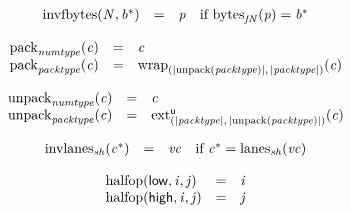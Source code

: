 $$
\begin{array}{@{}lcl@{}l@{}}
{\mathrm{invfbytes}}({\mathit{N}}, {{\mathit{b}}^\ast}) &=& {\mathit{p}} &\quad
  \mbox{if}~{{\mathrm{bytes}}}_{{{\mathit{f}}}{{\mathit{N}}}}({\mathit{p}}) = {{\mathit{b}}^\ast} \\
\end{array}
$$

\vspace{1ex}

\vspace{1ex}

$$
\begin{array}{@{}lcl@{}l@{}}
{{\mathrm{pack}}}_{{\mathit{numtype}}}({\mathit{c}}) &=& {\mathit{c}} &  \\
{{\mathrm{pack}}}_{{\mathit{packtype}}}({\mathit{c}}) &=& {{{\mathrm{wrap}}}_{({|{\mathrm{unpack}}({\mathit{packtype}})|},\, {|{\mathit{packtype}}|})}}{({\mathit{c}})} &  \\
\end{array}
$$

$$
\begin{array}{@{}lcl@{}l@{}}
{{\mathrm{unpack}}}_{{\mathit{numtype}}}({\mathit{c}}) &=& {\mathit{c}} &  \\
{{\mathrm{unpack}}}_{{\mathit{packtype}}}({\mathit{c}}) &=& {{{{\mathrm{ext}}}_{({|{\mathit{packtype}}|},\, {|{\mathrm{unpack}}({\mathit{packtype}})|})}^{\mathsf{u}}}}{({\mathit{c}})} &  \\
\end{array}
$$

\vspace{1ex}

$$
\begin{array}{@{}lcl@{}l@{}}
{{\mathrm{invlanes}}}_{{\mathit{sh}}}({{\mathit{c}}^\ast}) &=& {\mathit{vc}} &\quad
  \mbox{if}~{{\mathit{c}}^\ast} = {{\mathrm{lanes}}}_{{\mathit{sh}}}({\mathit{vc}}) \\
\end{array}
$$

$$
\begin{array}{@{}lcl@{}l@{}}
{\mathrm{halfop}}(\mathsf{low}, {\mathit{i}}, {\mathit{j}}) &=& {\mathit{i}} &  \\
{\mathrm{halfop}}(\mathsf{high}, {\mathit{i}}, {\mathit{j}}) &=& {\mathit{j}} &  \\
\end{array}
$$

